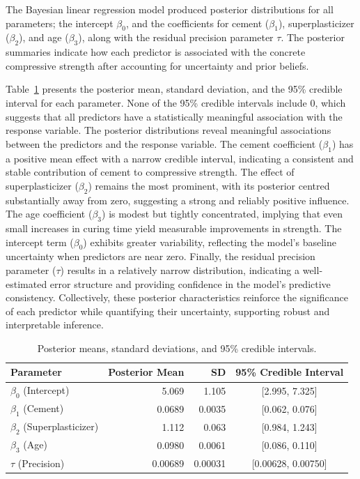 \documentclass[]{article}
\begin{document}
The Bayesian linear regression model produced posterior distributions for all parameters; the intercept $\beta_0$, and the coefficients for cement ($\beta_1$), superplasticizer ($\beta_2$), and age ($\beta_3$), along with the residual precision parameter $\tau$. The posterior summaries indicate how each predictor is associated with the concrete compressive strength after accounting for uncertainty and prior beliefs.

Table~\ref{tab:posterior_summary} presents the posterior mean, standard deviation, and the 95\% credible interval for each parameter. None of the 95\% credible intervals include 0, which suggests that all predictors have a statistically meaningful association with the response variable. The posterior distributions reveal meaningful associations between the predictors and the response variable. The cement coefficient ($\beta_1$) has a positive mean effect with a narrow credible interval, indicating a consistent and stable contribution of cement to compressive strength. The effect of superplasticizer ($\beta_2$) remains the most prominent, with its posterior centred substantially away from zero, suggesting a strong and reliably positive influence. The age coefficient ($\beta_3$) is modest but tightly concentrated, implying that even small increases in curing time yield measurable improvements in strength. The intercept term ($\beta_0$) exhibits greater variability, reflecting the model's baseline uncertainty when predictors are near zero. Finally, the residual precision parameter ($\tau$) results in a relatively narrow distribution, indicating a well-estimated error structure and providing confidence in the model's predictive consistency. Collectively, these posterior characteristics reinforce the significance of each predictor while quantifying their uncertainty, supporting robust and interpretable inference.

\begin{table}[H]
	\centering
	\begin{tabular}{|l|r|r|c|}
		\hline
		\textbf{Parameter} & \textbf{Posterior Mean} & \textbf{SD} & \textbf{95\% Credible Interval} \\
		\hline
		$\beta_0$ (Intercept)         & 5.069 & 1.105 & [2.995, 7.325] \\
		$\beta_1$ (Cement)            & 0.0689 & 0.0035 & [0.062, 0.076] \\
		$\beta_2$ (Superplasticizer)  & 1.112 & 0.063 & [0.984, 1.243] \\
		$\beta_3$ (Age)               & 0.0980 & 0.0061 & [0.086, 0.110] \\
		$\tau$ (Precision)            & 0.00689 & 0.00031 & [0.00628, 0.00750] \\
		\hline
	\end{tabular}
	\caption{Posterior means, standard deviations, and 95\% credible intervals.}
	\label{tab:posterior_summary}
\end{table}
\end{document}
